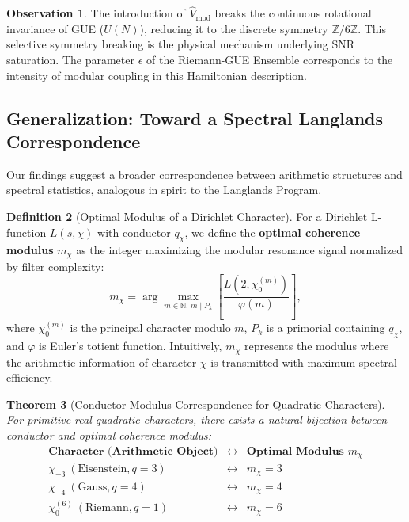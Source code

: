 \documentclass[12pt, a4paper]{article}
\theoremstyle{plain}
\newtheorem{teorema}{Theorem}[section]
\theoremstyle{definition}
\newtheorem{definicion}[teorema]{Definition}
\newtheorem{observacion}[teorema]{Observation}
\theoremstyle{remark}
\begin{document}
\begin{observacion}
The introduction of $\hat{V}_{\text{mod}}$ breaks the continuous rotational invariance of GUE ($U(N)$), reducing it to the discrete symmetry $\mathbb{Z}/6\mathbb{Z}$. This selective symmetry breaking is the physical mechanism underlying SNR saturation. The parameter $\epsilon$ of the Riemann-GUE Ensemble corresponds to the intensity of modular coupling in this Hamiltonian description.
\end{observacion}

\subsection{Generalization: Toward a Spectral Langlands Correspondence}
\label{ap:generalizacion_dirichlet}

Our findings suggest a broader correspondence between arithmetic structures and spectral statistics, analogous in spirit to the Langlands Program.

\begin{definicion}[Optimal Modulus of a Dirichlet Character]
For a Dirichlet L-function $L(s, \chi)$ with conductor $q_\chi$, we define the \textbf{optimal coherence modulus} $m_\chi$ as the integer maximizing the modular resonance signal normalized by filter complexity:
\[
m_\chi = \arg\max_{m \in \mathbb{N}, \, m \mid P_k} \left[ \frac{L(2, \chi_0^{(m)})}{\varphi(m)} \right],
\]
where $\chi_0^{(m)}$ is the principal character modulo $m$, $P_k$ is a primorial containing $q_\chi$, and $\varphi$ is Euler's totient function. Intuitively, $m_\chi$ represents the modulus where the arithmetic information of character $\chi$ is transmitted with maximum spectral efficiency.
\end{definicion}

\begin{teorema}[Conductor-Modulus Correspondence for Quadratic Characters]
For primitive real quadratic characters, there exists a natural bijection between conductor and optimal coherence modulus:
\[
\begin{array}{ccc}
\textbf{Character (Arithmetic Object)} & \longleftrightarrow & \textbf{Optimal Modulus } m_\chi \\
\hline
\chi_{-3} \ (\text{Eisenstein}, q=3) & \longleftrightarrow & m_{\chi} = 3 \\
\chi_{-4} \ (\text{Gauss}, q=4) & \longleftrightarrow & m_{\chi} = 4 \\
\chi_0^{(6)} \ (\text{Riemann}, q=1) & \longleftrightarrow & m_{\chi} = 6
\end{array}
\]
\end{teorema}
\end{document}
